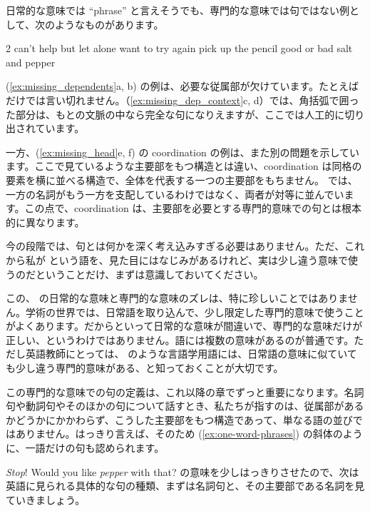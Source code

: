 日常的な意味では \enquote{phrase} と言えそうでも、専門的な意味では句ではない例として、次のようなものがあります。

\setlength{\columnsep}{0pt}
\begin{multicols}{2}
\ea
    \ea \label{ex:missing_dependents} can't help but
    \ex let alone
    \ex \label{ex:missing_dep_context} {\ob}want to{\cb} try again
    \ex {\ob}pick up{\cb} the pencil
    \ex good or bad\label{ex:missing_head}
    \ex  salt and pepper
\z
\z
\end{multicols}
(\ref{ex:missing_dependents}a, b) の例は、必要な従属部が欠けています。たとえば  だけでは言い切れません。（\ref{ex:missing_dep_context}c, d）では、角括弧で囲った部分は、もとの文脈の中なら完全な句になりえますが、ここでは人工的に切り出されています。

一方、(\ref{ex:missing_head}e, f) の coordination の例は、また別の問題を示しています。ここで見ているような主要部をもつ構造とは違い、coordination は同格の要素を横に並べる構造で、全体を代表する一つの主要部をもちません。 では、一方の名詞がもう一方を支配しているわけではなく、両者が対等に並んでいます。この点で、coordination は、主要部を必要とする専門的意味での句とは根本的に異なります。

今の段階では、句とは何かを深く考え込みすぎる必要はありません。ただ、これから私が  という語を、見た目にはなじみがあるけれど、実は少し違う意味で使うのだということだけ、まずは意識しておいてください。

この、 の日常的な意味と専門的な意味のズレは、特に珍しいことではありません。学術の世界では、日常語を取り込んで、少し限定した専門的意味で使うことがよくあります。だからといって日常的な意味が間違いで、専門的な意味だけが正しい、というわけではありません。語には複数の意味があるのが普通です。ただし英語教師にとっては、 のような言語学用語には、日常語の意味に似ていても少し違う専門的意味がある、と知っておくことが大切です。

この専門的な意味での句の定義は、これ以降の章でずっと重要になります。名詞句や動詞句やそのほかの句について話すとき、私たちが指すのは、従属部があるかどうかにかかわらず、こうした主要部をもつ構造であって、単なる語の並びではありません。はっきり言えば、そのため (\ref{ex:one-word-phrases}) の斜体のように、一語だけの句も認められます。

\ea \label{ex:one-word-phrases}
    \ea \emph{Stop}!
    \ex Would you like \emph{pepper} with that?
\z\z
{} の意味を少しはっきりさせたので、次は英語に見られる具体的な句の種類、まずは名詞句と、その主要部である名詞を見ていきましょう。

